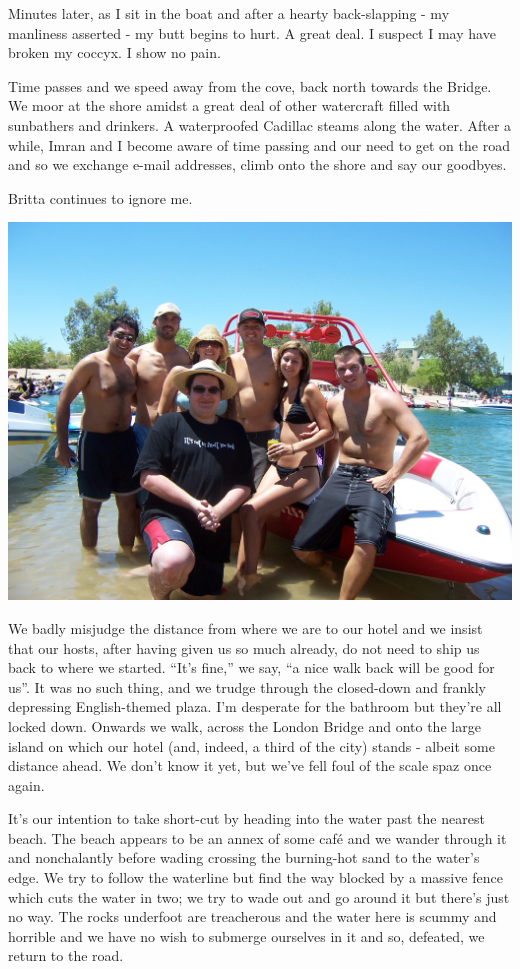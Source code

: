 \documentclass[a5paper,titlepage,11pt]{book}
\begin{document}
Minutes later, as I sit in the boat and after a hearty back-slapping - my manliness asserted - my butt begins to hurt.  A great deal.  I suspect I may have broken my coccyx.  I show no pain.

Time passes and we speed away from the cove, back north towards the Bridge.  We moor at the shore amidst a great deal of other watercraft filled with sunbathers and drinkers.  A waterproofed Cadillac steams along the water.  After a while, Imran and I become aware of time passing and our need to get on the road and so we exchange e-mail addresses, climb onto the shore and say our goodbyes.

Britta continues to ignore me.

\begin{center}\includegraphics[width=\textwidth]{gfx/100_1604}\end{center}

We badly misjudge the distance from where we are to our hotel and we insist that our hosts, after having given us so much already, do not need to ship us back to where we started.  ``It's fine,'' we say, ``a nice walk back will be good for us''.  It was no such thing, and we trudge through the closed-down and frankly depressing English-themed plaza.  I'm desperate for the bathroom but they're all locked down.  Onwards we walk, across the London Bridge and onto the large island on which our hotel (and, indeed, a third of the city) stands - albeit some distance ahead.  We don't know it yet, but we've fell foul of the scale spaz once again.

It's our intention to take short-cut by heading into the water past the nearest beach.  The beach appears to be an annex of some caf\'{e} and we wander through it and nonchalantly before wading crossing the burning-hot sand to the water's edge.  We try to follow the waterline but find the way blocked by a massive fence which cuts the water in two; we try to wade out and go around it but there's just no way.  The rocks underfoot are treacherous and the water here is scummy and horrible and we have no wish to submerge ourselves in it and so, defeated, we return to the road.
\end{document}
